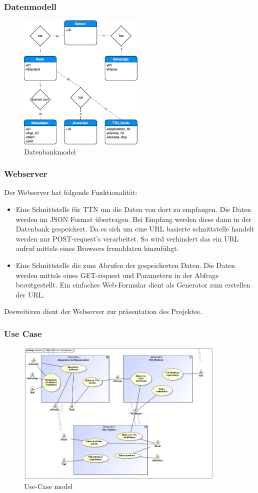\subsubsection{Datenmodell}
\begin{figure}[H]
	\centering
	\includegraphics[width=6cm]{figures/dbmodel.png}
	\caption{Datenbankmodel}
	\label{fig:dbModel}
\end{figure}

\subsubsection{Webserver}
Der Webserver hat folgende Funktionalität:
\begin{itemize}
	\item Eine Schnittstelle für TTN um die Daten von dort zu empfangen. Die Daten werden im JSON Format übertragen. Bei Empfang werden diese dann in der Datenbank gespeichert. Da es sich um eine URL basierte schnittstelle handelt werden nur POST-request's verarbeitet. So wird verhindert das ein URL aufruf mittels eines Browsers fremddaten hinzufühgt.
	\item Eine Schnittstelle die zum Abrufen der gespeicherten Daten. Die Daten werden mittels eines GET-request und Parametern in der Abfrage bereitgestellt. Ein einfaches Web-Formular dient als Generator zum erstellen der URL.
\end{itemize}
Desweiteren dient der Webserver zur präsentation des Projektes.

\subsubsection{Use Case}
\begin{figure}[H]
	\centering
	\includegraphics[width=10cm]{figures/use-case.png}
	\caption{Use-Case model}
	\label{fig:useCase}
\end{figure}